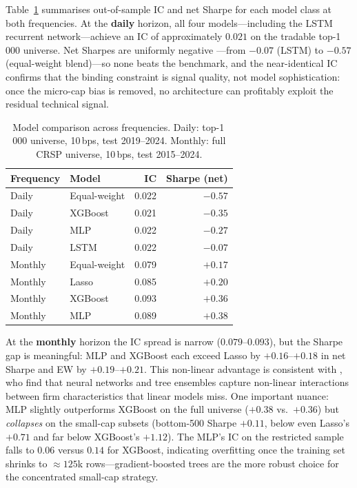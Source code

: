 \documentclass[11pt,a4paper]{article}
\begin{document}
Table~\ref{tab:models} summarises out-of-sample IC and net Sharpe for each
model class at both frequencies. At the \textbf{daily} horizon, all four
models---including the LSTM recurrent network---achieve an IC of approximately
$0.021$ on the tradable top-1\,000 universe. Net Sharpes are uniformly negative
---from $-0.07$ (LSTM) to $-0.57$ (equal-weight blend)---so none beats the
benchmark, and the near-identical IC confirms that the binding constraint is
signal quality, not model sophistication: once the micro-cap bias is removed, no
architecture can profitably exploit the residual technical signal.

\begin{table}[h]
\centering\small
\caption{Model comparison across frequencies. Daily: top-1\,000 universe,
10\,bps, test 2019--2024. Monthly: full CRSP universe, 10\,bps, test 2015--2024.}
\label{tab:models}
\begin{tabular}{llrr}
\toprule
Frequency & Model & IC & Sharpe (net) \\
\midrule
Daily & Equal-weight & 0.022 & $-0.57$ \\
Daily & XGBoost      & 0.021 & $-0.35$ \\
Daily & MLP          & 0.022 & $-0.27$ \\
Daily & LSTM         & 0.022 & $-0.07$ \\
\midrule
Monthly & Equal-weight & 0.079 & $+0.17$ \\
Monthly & Lasso        & 0.085 & $+0.20$ \\
Monthly & XGBoost      & 0.093 & $+0.36$ \\
Monthly & MLP          & 0.089 & $+0.38$ \\
\bottomrule
\end{tabular}
\end{table}

At the \textbf{monthly} horizon the IC spread is narrow ($0.079$--$0.093$), but
the Sharpe gap is meaningful: MLP and XGBoost each exceed Lasso by $+0.16$--$+0.18$
in net Sharpe and EW by $+0.19$--$+0.21$. This non-linear advantage is
consistent with \citet{gu2020}, who find that neural networks and tree ensembles
capture non-linear interactions between firm characteristics that linear models
miss. One important nuance: MLP slightly outperforms XGBoost on the full
universe ($+0.38$ vs.\ $+0.36$) but \emph{collapses} on the small-cap subsets
(bottom-500 Sharpe $+0.11$, below even Lasso's $+0.71$ and far below XGBoost's
$+1.12$). The MLP's IC on the restricted sample falls to $0.06$ versus
$0.14$ for XGBoost, indicating overfitting once the training set shrinks to
$\approx125$k rows---gradient-boosted trees are the more robust choice for the
concentrated small-cap strategy.
\end{document}

